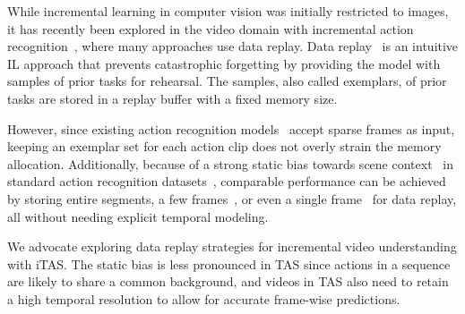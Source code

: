 

While incremental learning in computer vision was initially restricted to images, it has recently been explored in the video domain with incremental action recognition~\cite{villa2022vclimb,alssum2023just,park2021class,pei2022learning}, where many approaches use data replay. Data replay~\cite{rebuffi2017icarl} is an intuitive IL approach that prevents catastrophic forgetting by providing the model with samples of prior tasks for rehearsal. The samples, also called exemplars, of prior tasks are stored in a replay buffer with a fixed memory size.

However, since existing action recognition models~\cite{wang2016temporal,lin2019tsm} accept sparse frames as input, keeping an exemplar set for each action clip does not overly strain the memory allocation. Additionally, because of a strong static bias towards scene context~\cite{li2018resound} in standard action recognition datasets~\cite{carreira2017quo,soomro2012ucf101}, comparable performance can be achieved by storing entire segments, a few frames~\cite{villa2022vclimb}, or even a single frame~\cite{alssum2023just} for data replay, all without needing explicit temporal modeling. %

We advocate exploring data replay strategies for incremental video understanding with iTAS. The static bias is less pronounced in TAS since actions in a sequence are likely to share a common background, and videos in TAS also need to retain a high temporal resolution to allow for accurate frame-wise predictions.

